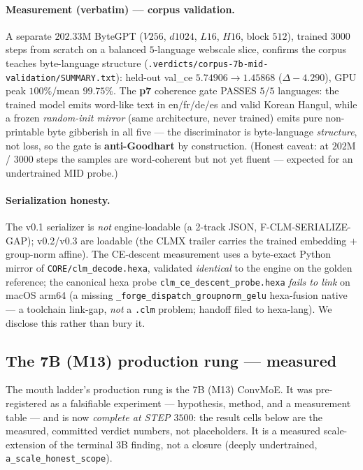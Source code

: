 \documentclass[11pt]{article}
\begin{document}
\paragraph{Measurement (verbatim) --- corpus validation.} A separate
$202.33$M ByteGPT ($V256$, $d1024$, $L16$, $H16$, block $512$), trained $3000$ steps
from scratch on a balanced $5$-language webscale slice, confirms the corpus teaches
byte-language structure (\texttt{.verdicts/corpus-7b-mid-validation/SUMMARY.txt}):
held-out val\_ce $5.74906\rightarrow1.45868$ ($\Delta-4.290$), GPU peak $100\%$/mean
$99.75\%$. The \textbf{p7} coherence gate PASSES $5/5$ languages: the trained model
emits word-like text in en/fr/de/es and valid Korean Hangul, while a frozen
\emph{random-init mirror} (same architecture, never trained) emits pure non-printable
byte gibberish in all five --- the discriminator is byte-language \emph{structure},
not loss, so the gate is \textbf{anti-Goodhart} by construction. (Honest caveat: at
$202$M / $3000$ steps the samples are word-coherent but not yet fluent --- expected
for an undertrained MID probe.)

\paragraph{Serialization honesty.} The v0.1 serializer is \emph{not}
engine-loadable (a 2-track JSON, F-CLM-SERIALIZE-GAP); v0.2/v0.3 are loadable (the
CLMX trailer carries the trained embedding $+$ group-norm affine). The CE-descent
measurement uses a byte-exact Python mirror of \texttt{CORE/clm\_decode.hexa},
validated \emph{identical} to the engine on the golden reference; the canonical hexa
probe \texttt{clm\_ce\_descent\_probe.hexa} \emph{fails to link} on macOS arm64
(a missing \texttt{\_forge\_dispatch\_groupnorm\_gelu} hexa-fusion native --- a
toolchain link-gap, \emph{not} a \texttt{.clm} problem; handoff filed to hexa-lang).
We disclose this rather than bury it.

\subsection{The 7B (M13) production rung --- measured}
\label{sec:m13}
The mouth ladder's production rung is the 7B (M13) ConvMoE. It was pre-registered as a
falsifiable experiment --- hypothesis, method, and a measurement table --- and is now
\emph{complete at STEP $3500$}: the result cells below are the measured, committed verdict
numbers, not placeholders. It is a measured scale-extension of the terminal $3$B finding, not
a closure (deeply undertrained, \texttt{a\_scale\_honest\_scope}).
\end{document}
